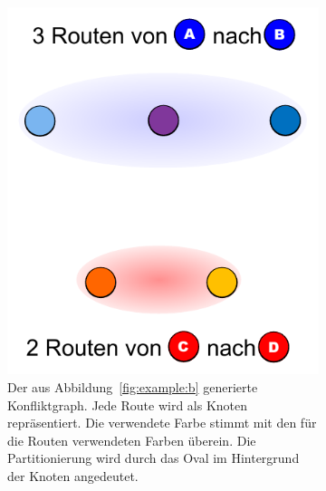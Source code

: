 \begin{figure}
	\centering
	\begin{subfigure}[t]{0.3\textwidth}
		\includegraphics[width=\textwidth]{img/bsp3}
		\caption{Der aus Abbildung~\ref{fig:example:b} generierte Konfliktgraph. Jede Route wird als Knoten repräsentiert. Die verwendete Farbe stimmt mit den für die Routen verwendeten Farben überein. Die Partitionierung wird durch das Oval im Hintergrund der Knoten angedeutet.}
		\label{fig:example:c}
	\end{subfigure}
	\begin{subfigure}[t]{0.3\textwidth}

\end{subfigure}
\end{figure}
